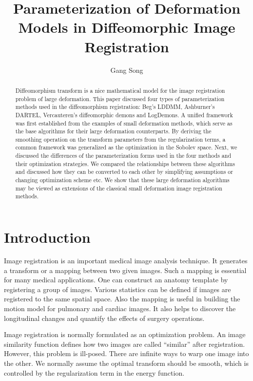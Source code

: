 \documentclass[letterpaper,12pt]{article}
\title{Parameterization of Deformation Models in Diffeomorphic Image Registration}
\author{Gang Song}
\date{}
\begin{document}
\maketitle
\begin{abstract}


Diffeomorphism transform is a nice mathematical model for the image registration problem of large deformation. This paper discussed four types of parameterization methods used in the diffeomorphism registration: Beg's LDDMM, Ashburner's DARTEL, Vercauteren's diffeomorphic demons and LogDemons. A unified framework was first established from the examples of small deformation methods, which serve as the base algorithms for their large deformation counterparts. By deriving the smoothing operation on the transform parameters from the regularization terms, a common framework was generalized as the optimization in the Sobolev space. Next, we discussed the differences of the parameterization forms used in the four methods and their optimization strategies. We compared the relationships between these algorithms and discussed how they can be converted to each other by simplifying assumptions or changing optimization scheme etc. We show that these
large deformation algorithms may be viewed as
extensions of the classical small deformation image registration methods. 

\end{abstract}



\section{Introduction}
\label{sec:intro}


Image registration is an important medical image analysis technique. It generates a transform or a mapping between two given images. Such a mapping is essential for many medical applications. One can construct an anatomy template by registering a group of images. Various statistics can be defined if images are registered to the same spatial space. Also the mapping is useful in building the motion model for pulmonary and cardiac images. It also helps to discover the longitudinal changes and quantify the effects of surgery operations.

Image registration is normally formulated as an optimization problem. An image similarity function defines how two images are called ``similar'' after registration. However, this problem is ill-posed. There are infinite ways to warp one image into the other. We normally assume the optimal transform should be smooth, which is controlled by the regularization term in the energy function. 
\end{document}
